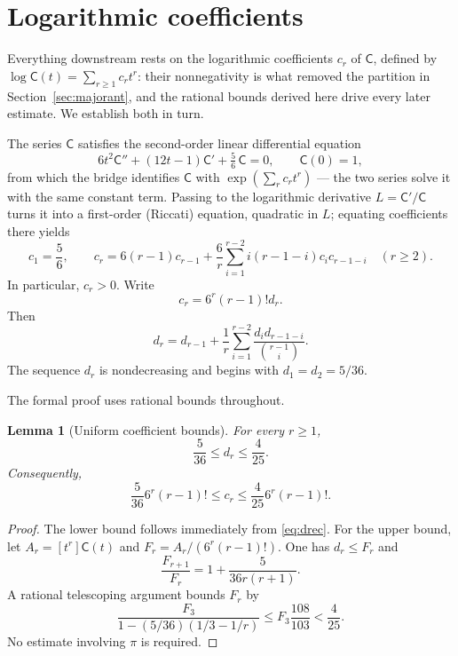 \documentclass[11pt]{article}
\newtheorem{lemma}[theorem]{Lemma}
\theoremstyle{definition}
\theoremstyle{remark}
\newcommand{\C}{\mathsf C}
\begin{document}
\section{Logarithmic coefficients}\label{sec:coeff}

Everything downstream rests on the logarithmic coefficients $c_r$ of $\C$,
defined by $\log\C(t)=\sum_{r\ge1}c_rt^r$: their nonnegativity is what removed
the partition in Section~\ref{sec:majorant}, and the rational bounds derived
here drive every later estimate.  We establish both in turn.

The series $\C$ satisfies the second-order linear differential equation
\[
  6t^2\C''+(12t-1)\C'+\tfrac56\,\C=0,\qquad \C(0)=1,
\]
from which the bridge identifies $\C$ with $\exp(\sum_rc_rt^r)$ --- the two
series solve it with the same constant term.  Passing to the logarithmic
derivative $L=\C'/\C$ turns it into a first-order (Riccati) equation, quadratic
in $L$; equating coefficients there yields
\begin{equation}\label{eq:crec}
  c_1=\frac56,
  \qquad
  c_r=6(r-1)c_{r-1}
       +\frac6r\sum_{i=1}^{r-2}i(r-1-i)c_ic_{r-1-i}
       \quad(r\ge2).
\end{equation}
In particular, $c_r>0$.  Write
\begin{equation}\label{eq:ddef}
  c_r=6^r(r-1)!d_r.
\end{equation}
Then
\begin{equation}\label{eq:drec}
  d_r=d_{r-1}+\frac1r\sum_{i=1}^{r-2}
   \frac{d_id_{r-1-i}}{\binom{r-1}{i}}.
\end{equation}
The sequence $d_r$ is nondecreasing and begins with
$d_1=d_2=5/36$.

The formal proof uses rational bounds throughout.

\begin{lemma}[Uniform coefficient bounds]\label{lem:d-bounds}
For every $r\ge1$,
\begin{equation}\label{eq:d-bounds}
  \frac5{36}\le d_r\le\frac4{25}.
\end{equation}
Consequently,
\begin{equation}\label{eq:c-bounds}
 \frac5{36}6^r(r-1)!\le c_r\le
 \frac4{25}6^r(r-1)!.
\end{equation}
\end{lemma}

\begin{proof}
The lower bound follows immediately from \eqref{eq:drec}.  For the upper
bound, let $A_r=[t^r]\C(t)$ and
$F_r=A_r/(6^r(r-1)!)$.  One has $d_r\le F_r$ and
\[
  \frac{F_{r+1}}{F_r}=1+\frac{5}{36r(r+1)}.
\]
A rational telescoping argument bounds $F_r$ by
\[
  \frac{F_3}{1-(5/36)(1/3-1/r)}
  \le F_3\frac{108}{103}<\frac4{25}.
\]
No estimate involving $\pi$ is required.
\end{proof}
\end{document}

